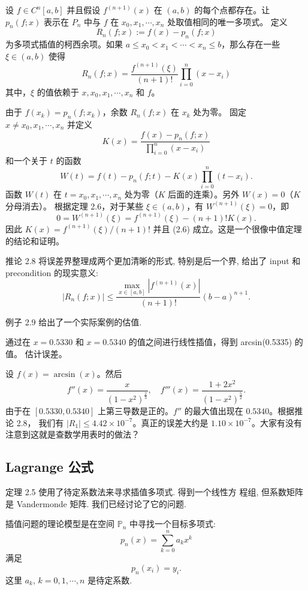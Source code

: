 \documentclass[a4paper]{ctexart}
\newcommand{\remark}[1]
{\noindent {\bf Remark {#1}}}
\begin{document}
 设 $f \in C^{n} [a, b]$ 并且假设 $f^{(n+1)} (x)$ 
在 $(a, b)$ 的每个点都存在。让 $p_n (f ; x)$ 表示在 $P_n$ 中与 $f$ 在 $x_0 , x_1 , \cdots , x_n$ 处取值相同的唯一多项式。
定义
\[
R_n (f ; x) := f (x) - p_n(f ; x) \tag{2.5}
\]
为多项式插值的柯西余项。如果 $a \leq x_0 < x_1 < \cdots < x_n \leq b$，那么存在一些 $\xi \in (a, b)$ 使得
\[
R_n (f ; x) = \frac{f^{(n+1)}(\xi)}{(n + 1)!} \prod_{i=0}^{n} (x - x_i) \tag{2.6}
\]
其中，$\xi$ 的值依赖于 $x, x_0 , x_1 , \cdots , x_n$ 和 $f$。

 由于 $f (x_k ) = p_n (f ; x_k )$，余数 $R_n (f ; x)$ 在 $x_k$ 处为零。
固定 $x \neq x_0, x_1 , \cdots , x_n$ 并定义
\[
K(x) = \frac{f (x) - p_n (f ; x)}{\prod_{i=0}^{n} (x - x_i)}
\]
和一个关于 $t$ 的函数
\[
W (t) = f (t) - p_n (f ; t) - K(x) \prod_{i=0}^{n} (t - x_i).
\]
函数 $W (t)$ 在 $t = x_0, x_1, \cdots , x_n$ 处为零（$K$ 后面的连乘）。另外 $W (x) = 0$（$K$ 分母消去）。
根据定理 2.6，对于某些 $\xi \in (a, b)$，有 $W^{(n+1)} (\xi) = 0$，即
\[
0 = W^{(n+1)} (\xi) = f^{(n+1)}(\xi) - (n + 1)!K(x).
\]
因此 $K(x) = f^{(n+1)} (\xi)/(n + 1)!$ 并且 (2.6) 成立。这是一个很像中值定理的结论和证明。

推论 2.8 将误差界整理成两个更加清晰的形式, 特别是后一个界, 给出了
input 和 precondition 的现实意义:
$$
|R_n(f; x)| \leq
\frac{\max_{x \in [a, b]}\left|f^{(n + 1)}(x)\right|}{(n + 1)!}(b - a)^{n + 1}.
$$

例子 2.9 给出了一个实际案例的估值.

 通过在 $x = 0.5330$ 和 $x = 0.5340$ 的值之间进行线性插值，得到 arcsin(0.5335) 的值。
估计误差。

设 $f (x) = \arcsin(x)$。然后
\[
f'' (x) = \frac{x}{(1 - x^2)^{\frac{2}{3}}}, \quad f''' (x) = \frac{1 + 2x^2}{(1 - x^2)^{\frac{5}{2}}}.
\]
由于在 $[0.5330, 0.5340]$ 上第三导数是正的。$f''$ 的最大值出现在 $0.5340$。根据推论 2.8，
我们有 $|R_1| \leq 4.42 \times 10^{-7}$。真正的误差大约是 $1.10 \times 10^{-7}$。大家有没有注意到这就是查数学用表时的做法？

\subsection{Lagrange 公式}
\remark{2.5} 定理 2.5 使用了待定系数法来寻求插值多项式. 得到一个线性方
程组, 但系数矩阵是 Vandermonde 矩阵. 我们已经讨论了它的问题.

插值问题的理论模型是在空间 $\mathbb{P}_n$ 中寻找一个目标多项式:
$$
p_n(x) = \sum_{k = 0}^n a_k x^k
$$
满足
$$
p_n(x_i) = y_i.
$$
这里 $a_k$, $k = 0, 1, \cdots, n$ 是待定系数.
\end{document}
